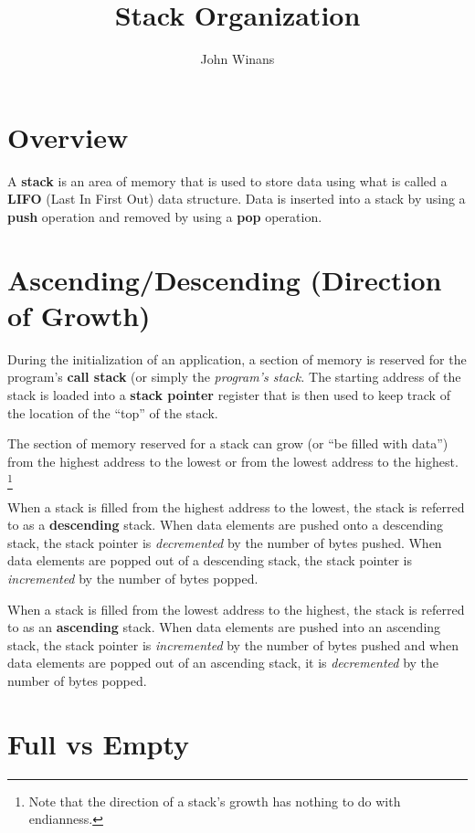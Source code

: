 \documentclass[10pt,letterpaper]{article}
\title{Stack Organization}
\author{John Winans}
\date{}
\begin{document}
\maketitle

\thispagestyle{fancy}

\section{Overview}

A \textbf{stack} is an area of memory that is used to store data using what 
is called a \textbf{LIFO} (Last In First Out) data structure.
Data is inserted into a stack by using a \textbf{push} operation and removed by 
using a \textbf{pop} operation.

\section{Ascending/Descending (Direction of Growth)}

During the initialization of an application, a section of memory is 
reserved for the program's \textbf{call stack} (or simply the {\em program's stack.}
The starting address of the stack is loaded into a \textbf{stack pointer}
register that is then used to keep track of the location of the ``top'' of the stack.

The section of memory reserved for a stack can grow (or ``be filled with data'') 
from the highest address to the lowest or from the lowest address to the highest.%
\footnote{Note that the direction of a stack's growth has nothing to do 
with endianness.}

When a stack is filled from the highest address to the lowest, the stack
is referred to as a \textbf{descending} stack. When data elements are pushed onto
a descending stack, the stack pointer is {\em decremented} by the number of 
bytes pushed. When data elements are popped out of a descending stack,
the stack pointer is {\em incremented} by the number of bytes popped.

When a stack is filled from the lowest address to the highest, the
stack is referred to as an \textbf{ascending} stack.  
When data elements are pushed into an ascending stack, the stack pointer is 
{\em incremented} by the number of bytes pushed and when data elements are 
popped out of an ascending stack, it is {\em decremented} by the number of bytes popped.


\section{Full vs Empty}
\end{document}
